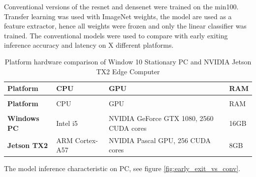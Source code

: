 Conventional versions of the \gls{resnet} and \gls{densenet} were trained on the \gls{min100}. Transfer learning was used with ImageNet weights, the model are used as a feature extractor, hence all weights were frozen and only the linear classifier was trained. The conventional models were used to compare with early exiting inference accuracy and latency on X different platforms.


\begin{longtabu}{>{\bfseries}X|X|X|X}
	\caption[Platform hardware comparison]{Platform hardware comparison of Window 10 Stationary PC and NVIDIA Jetson TX2 Edge Computer} \label{tbl:platforms} \\
	\toprule
	\rowfont{\bfseries}
	Platform & CPU & GPU & RAM  \tabularnewline
	\bottomrule
	\endfirsthead
	\\
	\toprule
	\rowfont{\bfseries}
	Platform & CPU & GPU & RAM  \tabularnewline
	\bottomrule
	\endhead %
	\bottomrule
	\\
	\endfoot
	\hline
	\endlastfoot
	Windows PC & Intel i5 & NVIDIA GeForce GTX 1080, 2560 CUDA cores & 16GB \tabularnewline
	\hline
	Jetson TX2 & ARM Cortex-A57 & NVIDIA Pascal GPU, 256 CUDA cores & 8GB \tabularnewline
	\bottomrule
\end{longtabu}

The model inference characteristic on PC, see figure \ref{fig:early_exit_vs_conv}.

  \begin{figure}
  	\captionsetup[subfigure]{justification=centering}
  	\centering
  	
  	
  \end{figure}

